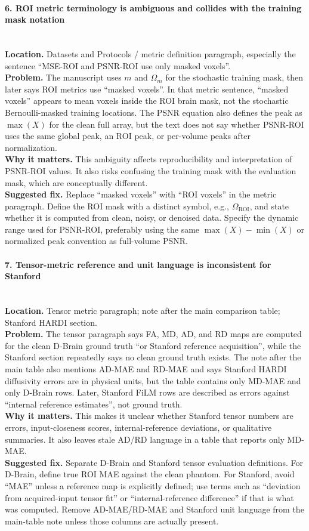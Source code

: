\documentclass[11pt]{article}
\newcommand{\findingtitle}[1]{\paragraph{#1}\mbox{}\\}
\newcommand{\loc}[1]{\textbf{Location.} #1\\}
\newcommand{\problem}[1]{\textbf{Problem.} #1\\}
\newcommand{\why}[1]{\textbf{Why it matters.} #1\\}
\newcommand{\fix}[1]{\textbf{Suggested fix.} #1\par}
\begin{document}
\findingtitle{6. ROI metric terminology is ambiguous and collides with the training mask notation}
\loc{Datasets and Protocols / metric definition paragraph, especially the sentence ``MSE-ROI and PSNR-ROI use only masked voxels''.}
\problem{The manuscript uses $m$ and $\Omega_m$ for the stochastic training mask, then later says ROI metrics use ``masked voxels''. In that metric sentence, ``masked voxels'' appears to mean voxels inside the ROI brain mask, not the stochastic Bernoulli-masked training locations. The PSNR equation also defines the peak as $\max(X)$ for the clean full array, but the text does not say whether PSNR-ROI uses the same global peak, an ROI peak, or per-volume peaks after normalization.}
\why{This ambiguity affects reproducibility and interpretation of PSNR-ROI values. It also risks confusing the training mask with the evaluation mask, which are conceptually different.}
\fix{Replace ``masked voxels'' with ``ROI voxels'' in the metric paragraph. Define the ROI mask with a distinct symbol, e.g., $\Omega_{\mathrm{ROI}}$, and state whether it is computed from clean, noisy, or denoised data. Specify the dynamic range used for PSNR-ROI, preferably using the same $\max(X)-\min(X)$ or normalized peak convention as full-volume PSNR.}

\findingtitle{7. Tensor-metric reference and unit language is inconsistent for Stanford}
\loc{Tensor metric paragraph; note after the main comparison table; Stanford HARDI section.}
\problem{The tensor paragraph says FA, MD, AD, and RD maps are computed for the clean D-Brain ground truth ``or Stanford reference acquisition'', while the Stanford section repeatedly says no clean ground truth exists. The note after the main table also mentions AD-MAE and RD-MAE and says Stanford HARDI diffusivity errors are in physical units, but the table contains only MD-MAE and only D-Brain rows. Later, Stanford FiLM rows are described as errors against ``internal reference estimates'', not ground truth.}
\why{This makes it unclear whether Stanford tensor numbers are errors, input-closeness scores, internal-reference deviations, or qualitative summaries. It also leaves stale AD/RD language in a table that reports only MD-MAE.}
\fix{Separate D-Brain and Stanford tensor evaluation definitions. For D-Brain, define true ROI MAE against the clean phantom. For Stanford, avoid ``MAE'' unless a reference map is explicitly defined; use terms such as ``deviation from acquired-input tensor fit'' or ``internal-reference difference'' if that is what was computed. Remove AD-MAE/RD-MAE and Stanford unit language from the main-table note unless those columns are actually present.}
\end{document}
